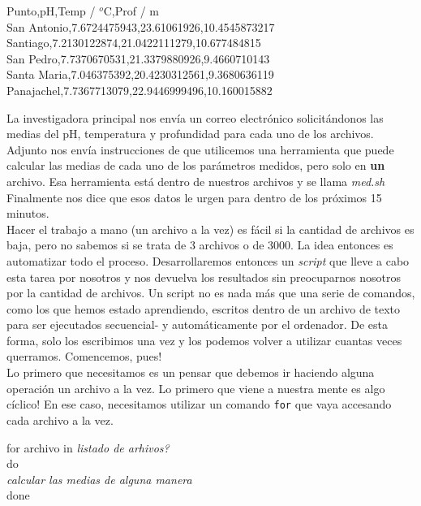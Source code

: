 \documentclass[10pt,letterpaper]{article}
\newcommand{\inlinecode}[1]{
\colorbox{light-gray}{\texttt{#1}}
}
\newenvironment{Code}
{
\begin{lrbox}{\selvestebox}%
\begin{minipage}{\dimexpr\columnwidth-2\fboxsep\relax}
\fontfamily{\ttdefault}\selectfont
}
{\end{minipage}\end{lrbox}%
\begin{center}
\colorbox{light-gray}{\usebox{\selvestebox}}
\end{center}
}
\begin{document}
\begin{Code}
Punto,pH,Temp / $^o$C,Prof / m\\
San Antonio,7.6724475943,23.61061926,10.4545873217\\
Santiago,7.2130122874,21.0422111279,10.677484815\\
San Pedro,7.7370670531,21.3379880926,9.4660710143\\
Santa Maria,7.046375392,20.4230312561,9.3680636119\\
Panajachel,7.7367713079,22.9446999496,10.160015882
\end{Code}

La investigadora principal nos env\'ia un correo electr\'onico solicit\'andonos las medias del pH, temperatura y profundidad para cada uno de los archivos. Adjunto nos env\'ia instrucciones de que utilicemos una herramienta que puede calcular las medias de cada uno de los par\'ametros medidos, pero solo en \textbf{un} archivo. Esa herramienta est\'a dentro de nuestros archivos y se llama \emph{med.sh} Finalmente nos dice que esos datos le urgen para dentro de los pr\'oximos 15 minutos.\\

Hacer el trabajo a mano (un archivo a la vez) es f\'acil si la cantidad de archivos es baja, pero no sabemos si se trata de 3 archivos o de 3000. La idea entonces es automatizar todo el proceso. Desarrollaremos entonces un \emph{script} que lleve a cabo esta tarea por nosotros y nos devuelva los resultados sin preocuparnos nosotros por la cantidad de archivos. Un script no es nada m\'as que una serie de comandos, como los que hemos estado aprendiendo, escritos dentro de un archivo de texto para ser ejecutados secuencial- y autom\'aticamente por el ordenador. De esta forma, solo los escribimos una vez y los podemos volver a utilizar cuantas veces querramos. Comencemos, pues!\\

Lo primero que necesitamos es un pensar que debemos ir haciendo alguna operaci\'on un archivo a la vez. Lo primero que viene a nuestra mente es algo c\'iclico! En ese caso, necesitamos utilizar un comando \inlinecode{for} que vaya accesando cada archivo a la vez.

\begin{Code}
for archivo in \emph{listado de arhivos?}\\
do\\
\emph{calcular las medias de alguna manera}\\
done
\end{Code}
\end{document}

